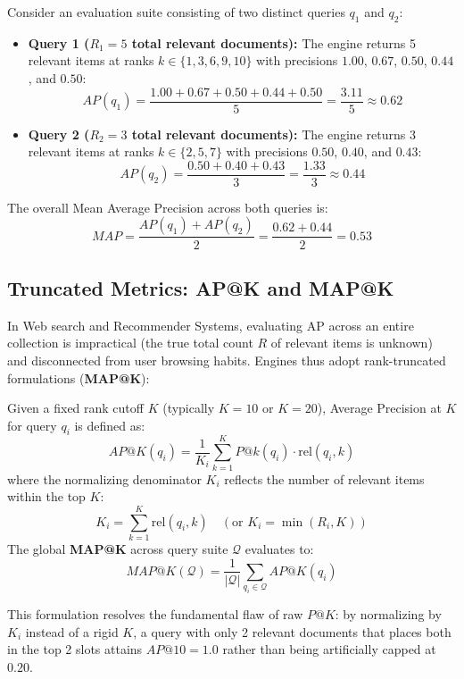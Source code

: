 \begin{example}
Consider an evaluation suite consisting of two distinct queries $q_1$ and $q_2$:
\begin{itemize}
    \item \textbf{Query 1 ($R_1 = 5$ total relevant documents):} The engine returns 5 relevant items at ranks $k \in \{1, 3, 6, 9, 10\}$ with precisions $1.00$, $0.67$, $0.50$, $0.44$, and $0.50$:
    \[
    AP(q_1) = \frac{1.00 + 0.67 + 0.50 + 0.44 + 0.50}{5} = \frac{3.11}{5} \approx \mathbf{0.62}
    \]
    \item \textbf{Query 2 ($R_2 = 3$ total relevant documents):} The engine returns 3 relevant items at ranks $k \in \{2, 5, 7\}$ with precisions $0.50$, $0.40$, and $0.43$:
    \[
    AP(q_2) = \frac{0.50 + 0.40 + 0.43}{3} = \frac{1.33}{3} \approx \mathbf{0.44}
    \]
\end{itemize}
The overall Mean Average Precision across both queries is:
\begin{equation}
MAP = \frac{AP(q_1) + AP(q_2)}{2} = \frac{0.62 + 0.44}{2} = \mathbf{0.53}
\end{equation}
\end{example}

\subsection{Truncated Metrics: AP@K and MAP@K}
In Web search and Recommender Systems, evaluating AP across an entire collection is impractical (the true total count $R$ of relevant items is unknown) and disconnected from user browsing habits.
Engines thus adopt rank-truncated formulations (\textbf{MAP@K}):

\begin{definition}
Given a fixed rank cutoff $K$ (typically $K=10$ or $K=20$), Average Precision at $K$ for query $q_i$ is defined as:
\begin{equation}
AP@K(q_i) = \frac{1}{K_i} \sum_{k=1}^K P@k(q_i) \cdot \mathrm{rel}(q_i, k)
\end{equation}
where the normalizing denominator $K_i$ reflects the number of relevant items within the top $K$:
\begin{equation}
K_i = \sum_{k=1}^K \mathrm{rel}(q_i, k) \quad \left(\text{or } K_i = \min(R_i, K)\right)
\end{equation}
The global \textbf{MAP@K} across query suite $\mathcal{Q}$ evaluates to:
\begin{equation}
MAP@K(\mathcal{Q}) = \frac{1}{|\mathcal{Q}|} \sum_{q_i \in \mathcal{Q}} AP@K(q_i)
\end{equation}
\end{definition}
This formulation resolves the fundamental flaw of raw $P@K$: by normalizing by $K_i$ instead of a rigid $K$, a query with only 2 relevant documents that places both in the top 2 slots attains $AP@10 = 1.0$ rather than being artificially capped at $0.20$.

